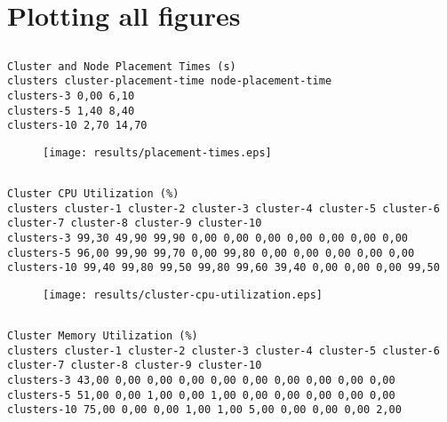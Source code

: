 \documentclass{elsart}
\begin{document}
\section{Plotting all figures}
\subsection{}

\begin{lstlisting}[caption={}]
Cluster and Node Placement Times (s)
clusters cluster-placement-time node-placement-time
clusters-3 0,00 6,10
clusters-5 1,40 8,40
clusters-10 2,70 14,70
\end{lstlisting}

\begin{figure}[ht]
\centering
\texttt{[image: results/placement-times.eps]}
\caption{}\label{fig:placement-times.eps}
\end{figure}

\subsection{}

\begin{lstlisting}[caption={}]
Cluster CPU Utilization (%)
clusters cluster-1 cluster-2 cluster-3 cluster-4 cluster-5 cluster-6 cluster-7 cluster-8 cluster-9 cluster-10
clusters-3 99,30 49,90 99,90 0,00 0,00 0,00 0,00 0,00 0,00 0,00
clusters-5 96,00 99,90 99,70 0,00 99,80 0,00 0,00 0,00 0,00 0,00
clusters-10 99,40 99,80 99,50 99,80 99,60 39,40 0,00 0,00 0,00 99,50
\end{lstlisting}

\begin{figure}[ht]
\centering
\texttt{[image: results/cluster-cpu-utilization.eps]}
\caption{}\label{fig:cluster-cpu-utilization.eps}
\end{figure}

\subsection{}

\begin{lstlisting}[caption={}]
Cluster Memory Utilization (%)
clusters cluster-1 cluster-2 cluster-3 cluster-4 cluster-5 cluster-6 cluster-7 cluster-8 cluster-9 cluster-10
clusters-3 43,00 0,00 0,00 0,00 0,00 0,00 0,00 0,00 0,00 0,00
clusters-5 51,00 0,00 1,00 0,00 1,00 0,00 0,00 0,00 0,00 0,00
clusters-10 75,00 0,00 0,00 1,00 1,00 5,00 0,00 0,00 0,00 2,00
\end{lstlisting}
\end{document}
